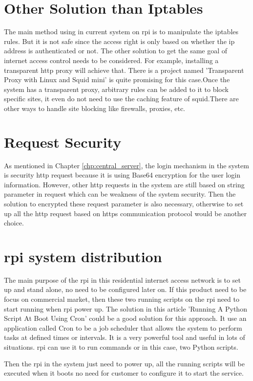 \section{Other Solution than Iptables}
\par The main method using in current system on \gls{rpi} is to manipulate the iptables rules. But it is not safe since the access right is only based on whether the \gls{ip} address is authenticated or not. The other solution to get the same goal of internet access control needs to be considered. For example, installing a transparent \gls{http} proxy will achieve that. There is a project named 'Transparent Proxy with Linux and Squid mini'\cite{transparentproxy} is quite promising for this case.Once the system has a transparent proxy, arbitrary rules can be added to it to block specific sites, it even do not need to use the caching feature of squid.There are other ways to handle site blocking like firewalls, proxies, etc.

\section{Request Security}
\par As mentioned in Chapter \ref{chp:central_server}, the login mechanism in the system is security \gls{http} request because it is using Base64 encryption for the user login information. However, other \gls{http} requests in the system are still based on string parameter in request which can be weakness of the system security. Then the solution to encrypted these request parameter is also necessary, otherwise to set up all the \gls{http} request based on \gls{https} communication protocol would be another choice.

\section{\gls{rpi} system distribution}
\par The main purpose of the \gls{rpi} in this residential internet access network is to set up and stand alone, no need to be configured later on. If this product need to be focus on commercial market, then these two running scripts on the \gls{rpi} need to start running when \gls{rpi} power up. The solution in this article 'Running A Python Script At Boot Using Cron'\cite{runatboot} could be a good solution for this approach. It use an application called Cron to be a job scheduler that allows the system to perform tasks at defined times or intervals. It is a very powerful tool and useful in lots of situations. \gls{rpi} can use it to run commands or in this case, two Python scripts.
\par Then the \gls{rpi} in the system just need to power up, all the running scripts will be executed when it boots no need for customer to configure it to start the service.